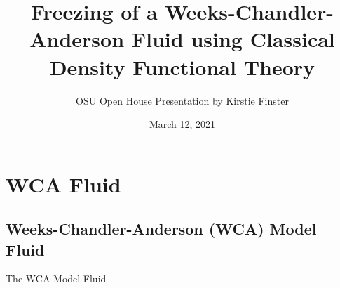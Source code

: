 \documentclass{beamer}
\title[Freezing a WCA Fluid using cDFT]{Freezing of a Weeks-Chandler-Anderson 
       Fluid using Classical Density Functional Theory}
\author{OSU Open House Presentation by Kirstie Finster}
\date{March 12, 2021}
\begin{document}


\begin{frame}
	\titlepage
\end{frame}


\section*{WCA Fluid}

\subsection*{Weeks-Chandler-Anderson (WCA) Model Fluid}
\begin{frame}{The WCA Model Fluid}
	\begin{columns}[t]
       	\vspace{-1.5em}
			    

\end{columns}
\end{frame}
\end{document}
